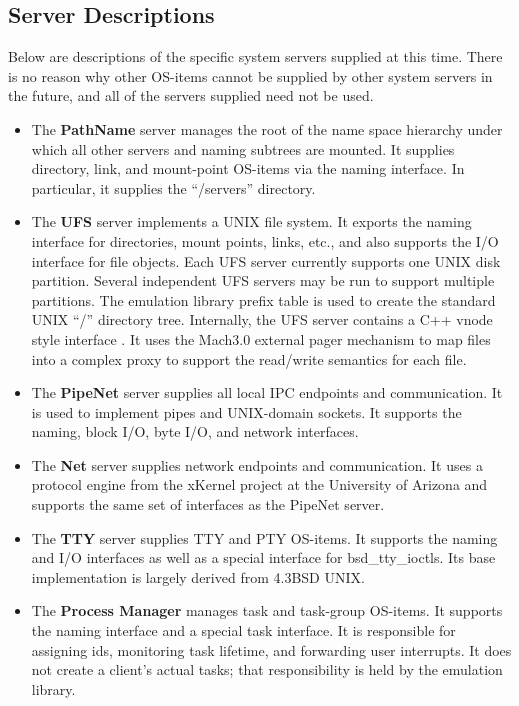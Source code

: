 \subsection{Server Descriptions}
Below are descriptions of the specific system servers supplied at this time.
There is no reason why other OS-items cannot be supplied by other system
servers in the future, and all of the servers supplied need not be used.
\begin{itemize}
\item
The {\bf PathName} server manages the root of the name space hierarchy
under which all other servers and naming subtrees are mounted.  It supplies
directory, link, and mount-point OS-items
via the naming interface.  
In particular, it supplies the ``/servers'' directory.

\item The {\bf UFS} server implements a UNIX file system. It exports the
naming interface for directories, mount
points, links, etc., and also supports the I/O interface for file objects.  
Each UFS server currently supports one UNIX disk partition. Several
independent UFS servers may be run to support multiple partitions.
The emulation library prefix table is used to create the standard UNIX
``/'' directory tree.  Internally, the UFS server
contains a C++ vnode style interface \cite{VNODES}.
It uses the Mach3.0 external pager \cite{EXT-PAGER}
mechanism to map files into a complex proxy to support the read/write semantics
for each file.  

\item The {\bf PipeNet} server supplies all local IPC endpoints and communication.
It is used to implement pipes and UNIX-domain sockets.  It supports the naming,
block I/O, byte I/O, and network interfaces.

\item The {\bf Net} server supplies network endpoints and communication.
It uses a protocol engine from the
xKernel project at the University of Arizona \cite{XKERNEL}
and supports the same set of interfaces as the PipeNet server.

\item The {\bf TTY} server
supplies TTY and PTY OS-items. It supports the naming and
I/O interfaces as well as a special interface for bsd\_tty\_ioctls.  Its base
implementation is largely derived from 4.3BSD UNIX.

\item The {\bf Process Manager} manages task and task-group OS-items.
It supports the
naming interface and a special task interface.  It is responsible for
assigning ids, monitoring task lifetime, and forwarding user interrupts.
It does not create a client's actual tasks; that responsibility is held by the
emulation library.
\end{itemize}
